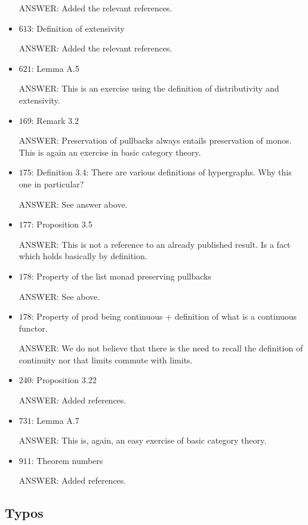 \documentclass[english,11pt,a4paper]{article}
\begin{document}
\begin{itemize}
	ANSWER: Added the relevant references.
	
	\item $613$: Definition of extensivity
	
	ANSWER: Added the relevant references.
	
	\item $621$: Lemma A.5
	
	ANSWER: This is an exercise using the definition of distributivity and extensivity.
	
\item 	$169$: Remark 3.2

ANSWER: Preservation of pullbacks always entails preservation of monos. This is again an exercise in basic category theory.
	
	\item $175$: Definition 3.4: There are various definitions of hypergraphs. Why this one in particular?
	
	ANSWER: See answer above.

	\item $177$: Proposition 3.5
	
	ANSWER: This is not a reference to an already published result. Is a fact which holds basically by definition.

\item $178$: Property of the list monad preserving pullbacks

ANSWER: See above.

	\item $178$: Property of prod being continuous + definition of what is a continuous functor.
	
ANSWER: We do not believe that there is the need to recall the definition of continuity nor that limits commute with limits.	
	
	\item $240$: Proposition 3.22
	
	ANSWER: Added references.
	
\item 	$731$: Lemma A.7
	
	ANSWER: This is, again, an easy exercise of basic category theory.
	
\item $	911$: Theorem numbers
	
	ANSWER: Added references.
	
	
\end{itemize}

\subsection*{Typos}
\end{document}
